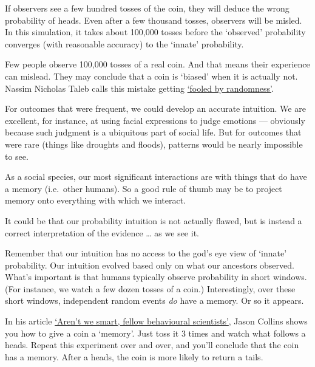 \documentclass[
]{book}
\begin{document}
If observers see a few hundred tosses of the coin, they will deduce the wrong probability of heads.
Even after a few thousand tosses, observers will be misled. In this simulation, it takes about 100,000 tosses before the `observed' probability converges (with reasonable accuracy) to the `innate' probability.

Few people observe 100,000 tosses of a real coin. And that means their experience can mislead. They may conclude that a coin is `biased' when it is actually not. Nassim Nicholas Taleb calls this mistake getting \href{https://en.wikipedia.org/wiki/Fooled_by_Randomness}{`fooled by randomness'}.

For outcomes that were frequent, we could develop an accurate intuition. We are excellent, for instance, at using facial expressions to judge emotions --- obviously because such judgment is a ubiquitous part of social life. But for outcomes that were rare (things like droughts and floods), patterns would be nearly impossible to see.

As a social species, our most significant interactions are with things that do have a memory (i.e.~other humans). So a good rule of thumb may be to project memory onto everything with which we interact.

It could be that our probability intuition is not actually flawed, but is instead a correct interpretation of the evidence \ldots{} as we see it.

Remember that our intuition has no access to the god's eye view of `innate' probability. Our intuition evolved based only on what our ancestors observed. What's important is that humans typically observe probability in short windows. (For instance, we watch a few dozen tosses of a coin.) Interestingly, over these short windows, independent random events \emph{do} have a memory. Or so it appears.

In his article \href{https://jasoncollins.blog/arent-we-smart-fellow-behavioural-scientists/}{`Aren't we smart, fellow behavioural scientists'}, Jason Collins shows you how to give a coin a `memory'. Just toss it 3 times and watch what follows a heads. Repeat this experiment over and over, and you'll conclude that the coin has a memory. After a heads, the coin is more likely to return a tails.
\end{document}
